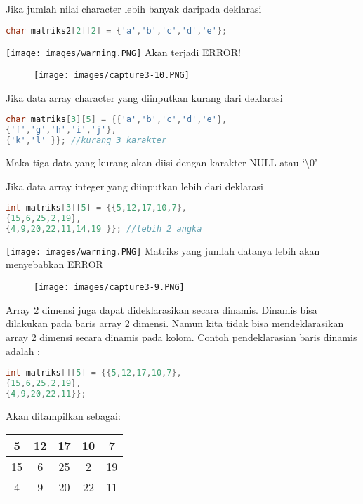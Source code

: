 Jika jumlah nilai character lebih banyak daripada deklarasi

\begin{lstlisting}[language=c++, numbers=none]
char matriks2[2][2] = {'a','b','c','d','e'};
\end{lstlisting}

\texttt{[image: images/warning.PNG]} Akan terjadi ERROR!

\begin{figure}[htbp]
\centering
\texttt{[image: images/capture3-10.PNG]}

\end{figure}

Jika data array character yang diinputkan kurang dari deklarasi

\begin{lstlisting}[language=c++, numbers=none]
char matriks[3][5] = {{'a','b','c','d','e'},
{'f','g','h','i','j'},
{'k','l' }}; //kurang 3 karakter
\end{lstlisting}

Maka tiga data yang kurang akan diisi dengan karakter NULL atau `\textbackslash{}0'

Jika data array integer yang diinputkan lebih dari deklarasi

\begin{lstlisting}[language=c++, numbers=none]
int matriks[3][5] = {{5,12,17,10,7},
{15,6,25,2,19},
{4,9,20,22,11,14,19 }}; //lebih 2 angka
\end{lstlisting}

\texttt{[image: images/warning.PNG]} Matriks yang jumlah datanya lebih akan menyebabkan ERROR


\begin{figure}
	\centering
\texttt{[image: images/capture3-9.PNG]}
\end{figure}




Array 2 dimensi juga dapat dideklarasikan secara dinamis. Dinamis bisa
dilakukan pada baris array 2 dimensi. Namun kita tidak bisa
mendeklarasikan array 2 dimensi secara dinamis pada kolom. Contoh
pendeklarasian baris dinamis adalah :

\begin{lstlisting}[language=c++, numbers=none]
int matriks[][5] = {{5,12,17,10,7},
{15,6,25,2,19},
{4,9,20,22,11}};
\end{lstlisting}

Akan ditampilkan sebagai:

\begin{tabular}{|c|c|c|c|c|}
	\hline
	5&12&17&10&7 \\ \hline
15&6&25&2&19 \\ \hline
4&9&20&22&11 \\ \hline
\end{tabular}


